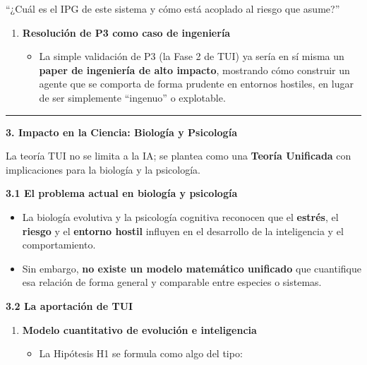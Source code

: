 ``¿Cuál es el IPG de este sistema y cómo está acoplado al riesgo que
asume?''

\begin{enumerate}
\def\labelenumi{\arabic{enumi}.}
\setcounter{enumi}{2}
\item
  \textbf{Resolución de P3 como caso de ingeniería}

  \begin{itemize}
  \item
    La simple validación de P3 (la Fase 2 de TUI) ya sería en sí misma
    un \textbf{paper de ingeniería de alto impacto}, mostrando cómo
    construir un agente que se comporta de forma prudente en entornos
    hostiles, en lugar de ser simplemente ``ingenuo'' o explotable.
  \end{itemize}
\end{enumerate}

\begin{center}\rule{0.5\linewidth}{0.5pt}\end{center}

\textbf{3. Impacto en la Ciencia: Biología y Psicología}

La teoría TUI no se limita a la IA; se plantea como una \textbf{Teoría
Unificada} con implicaciones para la biología y la psicología.

\textbf{3.1 El problema actual en biología y psicología}

\begin{itemize}
\item
  La biología evolutiva y la psicología cognitiva reconocen que el
  \textbf{estrés}, el \textbf{riesgo} y el \textbf{entorno hostil}
  influyen en el desarrollo de la inteligencia y el comportamiento.
\item
  Sin embargo, \textbf{no existe un modelo matemático unificado} que
  cuantifique esa relación de forma general y comparable entre especies
  o sistemas.
\end{itemize}

\textbf{3.2 La aportación de TUI}

\begin{enumerate}
\def\labelenumi{\arabic{enumi}.}
\item
  \textbf{Modelo cuantitativo de evolución e inteligencia}

  \begin{itemize}
  \item
    La Hipótesis H1 se formula como algo del tipo:
  \end{itemize}
\end{enumerate}

